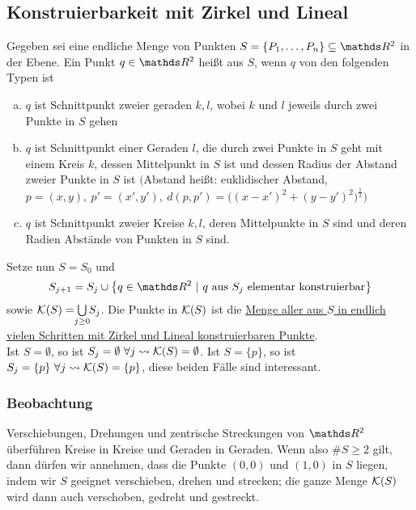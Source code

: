 \subsection{Konstruierbarkeit mit Zirkel und Lineal}
\label{sub:zirkel_lineal}
Gegeben sei eine endliche Menge von Punkten $S=\penbrace{P_1\dt{,}P_n}\subseteq \R^2$ in der Ebene.
Ein Punkt $q\in\R^2$ heißt  aus $S$, wenn $q$ von den folgenden Typen ist
\begin{enumerate}[(a)]
	\item $q$ ist Schnittpunkt zweier geraden $k,l$, wobei $k$ und $l$ jeweils durch zwei Punkte in $S$ gehen
	\item $q$ ist Schnittpunkt einer Geraden $l$, die durch zwei Punkte in $S$ geht mit einem Kreis $k$, dessen Mittelpunkt in $S$ ist und dessen Radius der Abstand zweier Punkte in $S$ ist $\bigg($Abstand heißt: euklidischer Abstand, $p=(x,y),~p'=(x',y'),~d(p,p')=\big((x-x')^2+(y-y')^2\big)^{\frac{1}{2}}\bigg)$
	\item $q$ ist Schnittpunkt zweier Kreise $k,l$, deren Mittelpunkte in $S$ sind und deren Radien Abstände von Punkten in $S$ sind.
\end{enumerate} 
Setze nun $S=S_0$ und
\[
S_{j+1}=S_j\cup \penbrace{q\in \R^2~|~q \text{ aus }S_j \text{ elementar konstruierbar}}
\]
sowie $\mc{K}(S)=\bigcup\ablim{j\ge 0}S_j$.
Die Punkte in $\mathcal{K}(S)$ ist die \uline{Menge aller aus $S$ in endlich vielen Schritten mit Zirkel und Lineal konstruierbaren Punkte}.\\
Ist $S=\emptyset$, so ist $S_j=\emptyset~\forall j\rightsquigarrow \mathcal{K}(S)=\emptyset$.
Ist $S=\{p\}$, so ist $S_j=\{p\}~\forall j\rightsquigarrow \mathcal{K}(S)=\{p\}$, diese beiden Fälle sind interessant.

\subsubsection*{Beobachtung}
Verschiebungen, Drehungen und zentrische Streckungen von $\R^2$ überführen Kreise in Kreise und Geraden in Geraden.
Wenn also $\#S\ge 2$ gilt, dann dürfen wir annehmen, dass die Punkte $(0,0)$ und $(1,0)$ in $S$ liegen, indem wir $S$ geeignet verschieben, drehen und strecken; die ganze Menge $\mathcal{K}(S)$ wird dann auch verschoben, gedreht und gestreckt.

